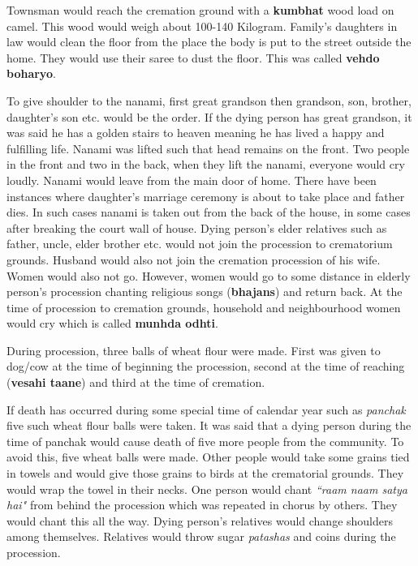 Townsman would reach the cremation ground with a \textbf{kumbhat} wood load on
camel. This wood would weigh about 100-140 Kilogram. Family's daughters in
law would clean the floor from the place the body is put to the street outside
the home. They would use their saree to dust the floor. This was called
\textbf{vehdo boharyo}.

To give shoulder to the nanami, first great grandson then grandson, son,
brother, daughter's son etc. would be the order. If the dying person has great
grandson, it was said he has a golden stairs to heaven meaning he has lived a
happy and fulfilling life. Nanami was lifted such that head remains on the
front. Two people in the front and two in the back, when they lift the nanami,
everyone would cry loudly. Nanami would leave from the main door of home. There
have been instances where daughter's marriage ceremony is about to take place
and father dies. In such cases nanami is taken out from the back of the house,
in some cases after breaking the court wall of house. Dying person's elder
relatives such as father, uncle, elder brother etc. would not join the
procession to crematorium grounds. Husband would also not join the cremation
procession of his wife. Women would also not go. However, women would go to
some distance in elderly person's procession chanting religious songs
(\textbf{bhajans}) and return back. At the time of procession to cremation
grounds, household and neighbourhood women would cry which is called
\textbf{munhda odhti}. 

During procession, three balls of wheat flour were made. First was given to dog/cow
at the time of beginning the procession, second at the time of reaching
(\textbf{vesahi taane}) and third at the time of cremation.

If death has occurred during some special time of calendar year such as
\textit{panchak} five such wheat flour balls were taken. It was said that a
dying person during the time of panchak would cause death of five more people
from the community. To avoid this, five wheat balls were made. Other people
would take some grains tied in towels and would give those grains to birds at
the crematorial grounds. They would wrap the towel in their necks. One person
would chant \textit{``raam naam satya hai"} from behind the procession which was
repeated in chorus by others. They would chant this all the way. Dying person's
relatives would change shoulders among themselves. Relatives would throw sugar
\textit{patashas} and coins during the procession.

